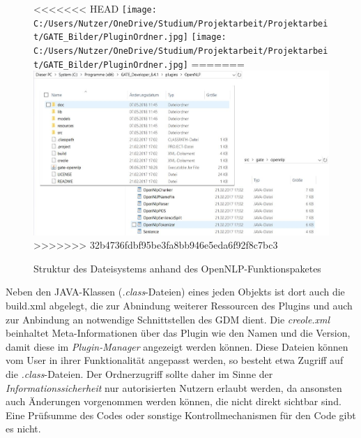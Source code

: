 \documentclass[12pt]{report}
\begin{document}
\begin{figure}[h!]
\begin{center}
<<<<<<< HEAD
\texttt{[image: C:/Users/Nutzer/OneDrive/Studium/Projektarbeit/Projektarbeit/GATE\_Bilder/PluginOrdner.jpg]}
\texttt{[image: C:/Users/Nutzer/OneDrive/Studium/Projektarbeit/Projektarbeit/GATE\_Bilder/PluginOrdner.jpg]}
=======
\includegraphics[scale=1.0]{GATE_Bilder/PluginOrdner.jpg}
>>>>>>> 32b4736fdbf95be3fa8bb946e5eda6f92f8c7bc3
\caption{Struktur des Dateisystems anhand des OpenNLP-Funktionspaketes}
\end{center}
\end{figure} 


Neben den JAVA-Klassen (\textit{.class}-Dateien) eines jeden Objekts ist dort auch die build.xml abgelegt, die zur Abnindung weiterer Ressourcen des Plugins und auch zur Anbindung an notwendige Schnittstellen des GDM dient. Die \textit{creole.xml} beinhaltet Meta-Informationen über das Plugin wie den Namen und die Version, damit diese im \textit{Plugin-Manager} angezeigt werden können. Diese Dateien können vom User in ihrer Funktionalität angepasst werden, so besteht etwa Zugriff auf die \textit{.class}-Dateien. Der Ordnerzugriff sollte daher im Sinne der \textit{Informationssicherheit} nur autorisierten Nutzern erlaubt werden, da ansonsten auch Änderungen vorgenommen werden können, die nicht direkt sichtbar sind. Eine Prüfsumme des Codes oder sonstige Kontrollmechanismen für den Code gibt es nicht.
\end{document}
